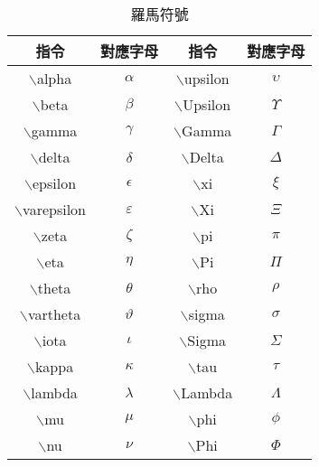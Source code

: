 \begin{longtable}{c c c c}
    \caption{羅馬符號}\label{tb:sign} \\
     指令 & 對應字母 & 指令 & 對應字母 \\\hline 
     {\A $\backslash$alpha} & $\alpha$ & {\A $\backslash$upsilon} & $\upsilon$ \\
     {\A $\backslash$beta}  & $\beta$ & {\A $\backslash$Upsilon} & $\Upsilon$ \\
     {\A $\backslash$gamma} & $\gamma$ & {\A $\backslash$Gamma} & $\Gamma$ \\
     {\A $\backslash$delta} & $\delta$	& {\A $\backslash$Delta} & $\Delta$ \\
     {\A $\backslash$epsilon} & $\epsilon$ & {\A $\backslash$xi} & $\xi$ \\
     {\A $\backslash$varepsilon} & $\varepsilon$ & {\A $\backslash$Xi} & $\Xi$ \\
     {\A $\backslash$zeta} & $\zeta$ & {\A $\backslash$pi} & $\pi$ \\
     {\A $\backslash$eta} &  $\eta$ & {\A $\backslash$Pi}  & $\Pi$ \\
     {\A $\backslash$theta} & $\theta$ & {\A $\backslash$rho}  & $\rho$ \\
     {\A $\backslash$vartheta} & $\vartheta$ & {\A $\backslash$sigma} & $\sigma$ \\
     {\A $\backslash$iota} & $\iota$ & {\A $\backslash$Sigma} & $\Sigma$ \\
     {\A $\backslash$kappa} & $\kappa$ & {\A $\backslash$tau} & $\tau$ \\
     {\A $\backslash$lambda} & $\lambda$ & {\A $\backslash$Lambda} & $\Lambda$\\ 
     {\A $\backslash$mu} & $\mu$ & {\A $\backslash$phi} & $\phi$ \\
     {\A $\backslash$nu} & $\nu$ & {\A $\backslash$Phi} & $\Phi$ \\\hline
\end{longtable}

